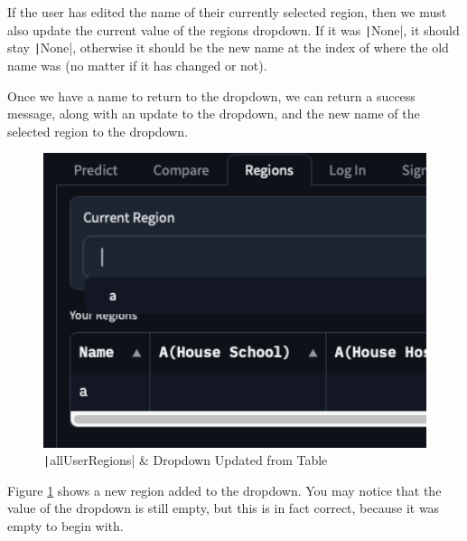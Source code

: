 \documentclass[12pt]{report}
\newcommand{\pil}[1]{\protect\texttt|#1|}
\begin{document}
If the user has edited the name of their currently selected region, then we must also update the current value of the regions dropdown. If it was \pil{None}, it should stay \pil{None}, otherwise it should be the new name at the index of where the old name was (no matter if it has changed or not).

Once we have a name to return to the dropdown, we can return a success message, along with an update to the dropdown, and the new name of the selected region to the dropdown.

\begin{figure}[H]
\centering
\includegraphics[width=13cm]{ss20.9.png}
\caption{\pil{allUserRegions} \& Dropdown Updated from Table}\label{fig:ss20.9}
\end{figure}

Figure \ref{fig:ss20.9} shows a new region added to the dropdown. You may notice that the value of the dropdown is still empty, but this is in fact correct, because it was empty to begin with.

\begin{center}
\end{center}
\end{document}
